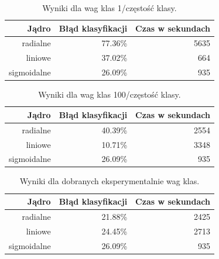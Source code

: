 \documentclass[a4paper, 12pt]{article}
\begin{document}
\begin{table}[H]
\centering
\begin{tabular}{ | r | r | r | } \hline
Jądro & Błąd klasyfikacji & Czas w sekundach \\ \hline
radialne & 77.36\% & 5635 \\ \hline
liniowe & 37.02\% & 664 \\ \hline
sigmoidalne & 26.09\% & 935 \\ \hline
\end{tabular} 
\caption{Wyniki dla wag klas 1/częstość klasy.}
\end{table}

\begin{table}[H]
\centering
\begin{tabular}{ | r | r | r | } \hline
Jądro & Błąd klasyfikacji & Czas w sekundach \\ \hline
radialne & 40.39\% & 2554 \\ \hline
liniowe & 10.71\% & 3348 \\ \hline
sigmoidalne & 26.09\% & 935 \\ \hline
\end{tabular} 
\caption{Wyniki dla wag klas 100/częstość klasy.}
\end{table}

\begin{table}[H]
\centering
\begin{tabular}{ | r | r | r | } \hline
Jądro & Błąd klasyfikacji & Czas w sekundach \\ \hline
radialne & 21.88\% & 2425 \\ \hline
liniowe & 24.45\% & 2713 \\ \hline
sigmoidalne & 26.09\% & 935 \\ \hline
\end{tabular} 
\caption{Wyniki dla dobranych eksperymentalnie wag klas.}
\end{table}
\end{document}
